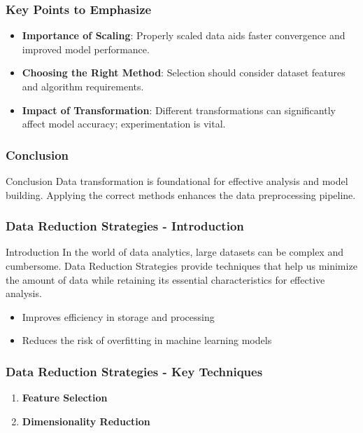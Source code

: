 \documentclass{beamer}
\begin{document}
\begin{frame}[fragile]
    \frametitle{Key Points to Emphasize}
    \begin{itemize}
        \item \textbf{Importance of Scaling}: Properly scaled data aids faster convergence and improved model performance.
        \item \textbf{Choosing the Right Method}: Selection should consider dataset features and algorithm requirements.
        \item \textbf{Impact of Transformation}: Different transformations can significantly affect model accuracy; experimentation is vital.
    \end{itemize}
\end{frame}

\begin{frame}[fragile]
    \frametitle{Conclusion}
    \begin{block}{Conclusion}
        Data transformation is foundational for effective analysis and model building. Applying the correct methods enhances the data preprocessing pipeline.
    \end{block}
\end{frame}

\begin{frame}[fragile]
    \frametitle{Data Reduction Strategies - Introduction}
    \begin{block}{Introduction}
        In the world of data analytics, large datasets can be complex and cumbersome. Data Reduction Strategies provide techniques that help us minimize the amount of data while retaining its essential characteristics for effective analysis. 
    \end{block}
    \begin{itemize}
        \item Improves efficiency in storage and processing
        \item Reduces the risk of overfitting in machine learning models
    \end{itemize}
\end{frame}

\begin{frame}[fragile]
    \frametitle{Data Reduction Strategies - Key Techniques}
    \begin{enumerate}
        \item \textbf{Feature Selection}
        \item \textbf{Dimensionality Reduction}
    \end{enumerate}
\end{frame}
\end{document}
